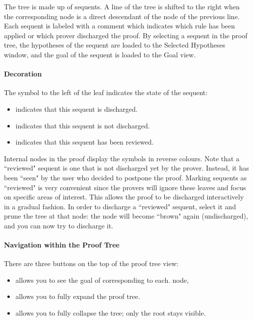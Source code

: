 The tree is made up of sequents. A line of the tree is shifted to the right when the corresponding node is a direct descendant of the node of the previous line. Each sequent is labeled with a comment which indicates which rule has been applied or which prover discharged the proof. By selecting a sequent in the proof tree, the hypotheses of the sequent are loaded to the \textsf{Selected Hypotheses window}, and the goal of the sequent is loaded to the \textsf{Goal view}.

\paragraph{Decoration}

The symbol to the left of the leaf indicates the state of the sequent:

\begin{itemize}
	\item {} indicates that this sequent is discharged.
	\item {} indicates that this sequent is not discharged.
	\item {} indicates that this sequent has been reviewed. 
\end{itemize}

Internal nodes in the proof display the symbols in reverse colours. Note that a ``reviewed" sequent is one that is not discharged yet by the prover. Instead, it has been ``seen" by the user who decided to postpone the proof. Marking sequents as ``reviewed" is very convenient since the provers will ignore these leaves and focus on specific areas of interest. This allows the proof to be discharged interactively in a gradual fashion. In order to discharge a ``reviewed" sequent, select it and prune the tree at that node: the node will become ``brown" again (undischarged), and you can now try to discharge it. 

\paragraph{Navigation within the Proof Tree}

There are three buttons on the top of the proof tree view:

\begin{itemize}
	\item {} allows you to see the goal of corresponding to each. node,
	\item {} allows you to fully expand the proof tree.
	\item {} allows you to fully collapse the tree; only the root stays visible. 
\end{itemize}

